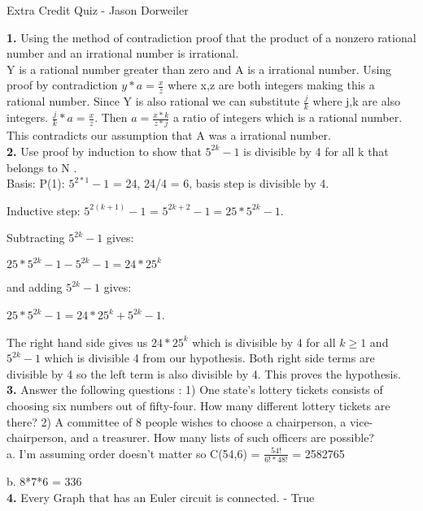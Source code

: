 \documentclass{article}
\begin{document}
Extra Credit Quiz -  Jason Dorweiler

\textbf{1.} Using the method of contradiction proof that the product of a nonzero rational number and an irrational number is irrational.\\

Y is a rational number greater than zero and A is a irrational number. Using proof by contradiction $y*a = \frac{x}{z}$ where x,z are both integers making this a rational number. Since Y is also  rational we can substitute $\frac{j}{k}$ where j,k are also integers.  $\frac{j}{k}*a = \frac{x}{z}$.  Then $a = \frac{x*k}{z*j}$ a ratio of integers which is a rational number.  This contradicts our assumption that A was a irrational number. \\

\textbf{2.} Use proof by induction to show that $5^{2k} - 1$ is divisible by 4 for all  k that belongs to N .\\

Basis: P(1): $5^{2*1}-1$ = 24, 24/4 = 6, basis step is divisible by 4. 

Inductive step: $5^{2(k+1)}-1$ = $5^{2k+2}-1 = 25*5^{2k}-1$.  

Subtracting $5^{2k}-1$ gives:

$25*5^{2k}-1-5^{2k}-1 = 24*25^k$ 

and adding $5^{2k}-1$ gives:

$25*5^{2k}-1 = 24*25^k + 5^{2k}-1$.  

The right hand side gives us $24*25^k$ which is divisible by 4 for all $k\geq1$ and  $5^{2k}-1$ which is divisible 4 from our hypothesis.  Both right side terms are divisible by 4 so the left term is also divisible by 4. This proves the hypothesis. \\

\textbf{3.}  Answer the following questions :
1) One state's lottery tickets consists of choosing six numbers out of fifty-four. How many different lottery tickets are there?
2) A committee of 8 people wishes to choose a chairperson, a vice-chairperson, and a treasurer. How many lists of such officers are possible?\\

a. I'm assuming order doesn't matter so C(54,6) = $\frac{54!}{6!*48!}$ = 2582765

b. 8*7*6 = 336\\

\textbf{4.}  Every Graph that has an Euler circuit is connected. - True \\
\end{document}
